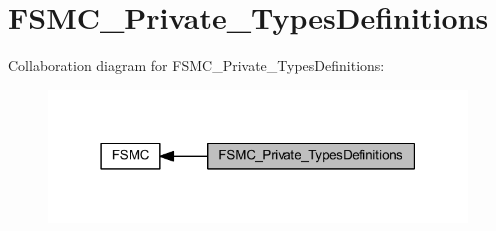 \hypertarget{group___f_s_m_c___private___types_definitions}{}\section{F\+S\+M\+C\+\_\+\+Private\+\_\+\+Types\+Definitions}
\label{group___f_s_m_c___private___types_definitions}
Collaboration diagram for F\+S\+M\+C\+\_\+\+Private\+\_\+\+Types\+Definitions\+:
\nopagebreak
\begin{figure}[H]
\begin{center}
\leavevmode
\includegraphics[width=315pt]{group___f_s_m_c___private___types_definitions}
\end{center}
\end{figure}
